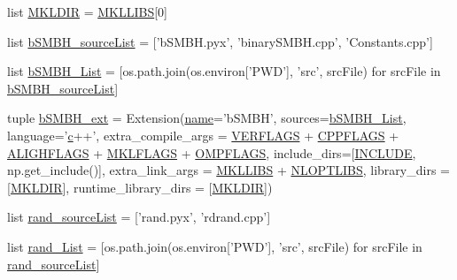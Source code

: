 \begin{DoxyCompactItemize}
\item 
list \hyperlink{namespacesetup_a71664edfdcf98a1ed2159a5cb4a7d196}{M\-K\-L\-D\-I\-R} = \hyperlink{namespacesetup_a3ecd92f8e1e53dd6528359a08aee59e9}{M\-K\-L\-L\-I\-B\-S}\mbox{[}0\mbox{]}
\item 
list \hyperlink{namespacesetup_aaae7fa8a3db10577b6550c7b841e4669}{b\-S\-M\-B\-H\-\_\-source\-List} = \mbox{[}'b\-S\-M\-B\-H.\-pyx', 'binary\-S\-M\-B\-H.\-cpp', 'Constants.\-cpp'\mbox{]}
\item 
list \hyperlink{namespacesetup_a8e78a501073cfe941c05b388c2e7956e}{b\-S\-M\-B\-H\-\_\-\-List} = \mbox{[}os.\-path.\-join(os.\-environ\mbox{[}'P\-W\-D'\mbox{]}, 'src', src\-File) for src\-File in \hyperlink{namespacesetup_aaae7fa8a3db10577b6550c7b841e4669}{b\-S\-M\-B\-H\-\_\-source\-List}\mbox{]}
\item 
tuple \hyperlink{namespacesetup_a91a3cd768577c74b324ef9e0fdc8ae24}{b\-S\-M\-B\-H\-\_\-ext} = Extension(\hyperlink{namespacesetup_a61de3710bf6c9d78c0afa352263f8b09}{name}='b\-S\-M\-B\-H', sources=\hyperlink{namespacesetup_a8e78a501073cfe941c05b388c2e7956e}{b\-S\-M\-B\-H\-\_\-\-List}, language='\hyperlink{_constants_8cpp_a2c09e929a6ea340fc9653cca414b11d3}{c}++', extra\-\_\-compile\-\_\-args = \hyperlink{namespacesetup_a4b1725ffabf7e972e9416fc047daa758}{V\-E\-R\-F\-L\-A\-G\-S} + \hyperlink{namespacesetup_a94afbb2834cc36eb3a362aec00c4f0bb}{C\-P\-P\-F\-L\-A\-G\-S} + \hyperlink{namespacesetup_ad6de2d2793e8dad016a00e201563ff15}{A\-L\-I\-G\-H\-F\-L\-A\-G\-S} + \hyperlink{namespacesetup_a356d52830aa81f3e0cfda1095f3162f8}{M\-K\-L\-F\-L\-A\-G\-S} + \hyperlink{namespacesetup_aa0d1a93d0a5a5a10a02c0cac8dbcaa02}{O\-M\-P\-F\-L\-A\-G\-S}, include\-\_\-dirs=\mbox{[}\hyperlink{namespacesetup_acf0d303c559d8ca52f78fb7970b2de4d}{I\-N\-C\-L\-U\-D\-E}, np.\-get\-\_\-include()\mbox{]}, extra\-\_\-link\-\_\-args = \hyperlink{namespacesetup_a3ecd92f8e1e53dd6528359a08aee59e9}{M\-K\-L\-L\-I\-B\-S} + \hyperlink{namespacesetup_ae8e55c011b0f75d872a51166b37395ae}{N\-L\-O\-P\-T\-L\-I\-B\-S}, library\-\_\-dirs = \mbox{[}\hyperlink{namespacesetup_a71664edfdcf98a1ed2159a5cb4a7d196}{M\-K\-L\-D\-I\-R}\mbox{]}, runtime\-\_\-library\-\_\-dirs = \mbox{[}\hyperlink{namespacesetup_a71664edfdcf98a1ed2159a5cb4a7d196}{M\-K\-L\-D\-I\-R}\mbox{]})
\item 
list \hyperlink{namespacesetup_a79e06cfe494233c86ded36a5f7852f95}{rand\-\_\-source\-List} = \mbox{[}'rand.\-pyx', 'rdrand.\-cpp'\mbox{]}
\item 
list \hyperlink{namespacesetup_a7c78e16e81c92c4cb8ed8c293b885193}{rand\-\_\-\-List} = \mbox{[}os.\-path.\-join(os.\-environ\mbox{[}'P\-W\-D'\mbox{]}, 'src', src\-File) for src\-File in \hyperlink{namespacesetup_a79e06cfe494233c86ded36a5f7852f95}{rand\-\_\-source\-List}\mbox{]}

\end{DoxyCompactItemize}

